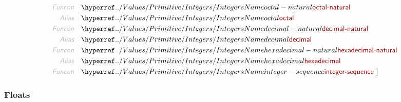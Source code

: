 \begin{align*}
  \KEY{Funcon} \quad & \NAMEHYPER{../Values/Primitive}{Integers}{octal-natural} \\
  \KEY{Alias} \quad & \NAMEHYPER{../Values/Primitive}{Integers}{octal} \\
  \KEY{Funcon} \quad & \NAMEHYPER{../Values/Primitive}{Integers}{decimal-natural} \\
  \KEY{Alias} \quad & \NAMEHYPER{../Values/Primitive}{Integers}{decimal} \\
  \KEY{Funcon} \quad & \NAMEHYPER{../Values/Primitive}{Integers}{hexadecimal-natural} \\
  \KEY{Alias} \quad & \NAMEHYPER{../Values/Primitive}{Integers}{hexadecimal} \\
  \KEY{Funcon} \quad & \NAMEHYPER{../Values/Primitive}{Integers}{integer-sequence}
  \ ]
\end{align*}
\subsubsection{Floats}\hypertarget{floats}{}\label{floats}


